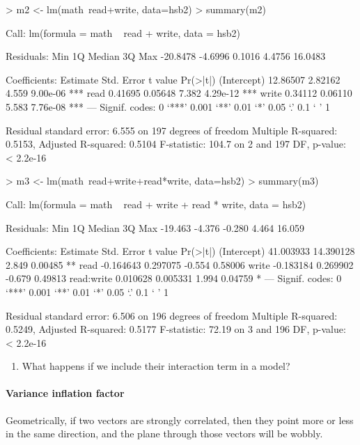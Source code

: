 \documentclass[10pt]{article}
\begin{document}
\begin{Schunk}
\begin{Sinput}
> m2 <- lm(math~read+write, data=hsb2)
> summary(m2)
\end{Sinput}
\begin{Soutput}
Call:
lm(formula = math ~ read + write, data = hsb2)

Residuals:
     Min       1Q   Median       3Q      Max 
-20.8478  -4.6996   0.1016   4.4756  16.0483 

Coefficients:
            Estimate Std. Error t value Pr(>|t|)    
(Intercept) 12.86507    2.82162   4.559 9.00e-06 ***
read         0.41695    0.05648   7.382 4.29e-12 ***
write        0.34112    0.06110   5.583 7.76e-08 ***
---
Signif. codes:  0 ‘***’ 0.001 ‘**’ 0.01 ‘*’ 0.05 ‘.’ 0.1 ‘ ’ 1

Residual standard error: 6.555 on 197 degrees of freedom
Multiple R-squared:  0.5153,	Adjusted R-squared:  0.5104 
F-statistic: 104.7 on 2 and 197 DF,  p-value: < 2.2e-16
\end{Soutput}
\begin{Sinput}
> m3 <- lm(math~read+write+read*write, data=hsb2)
> summary(m3)
\end{Sinput}
\begin{Soutput}
Call:
lm(formula = math ~ read + write + read * write, data = hsb2)

Residuals:
    Min      1Q  Median      3Q     Max 
-19.463  -4.376  -0.280   4.464  16.059 

Coefficients:
             Estimate Std. Error t value Pr(>|t|)   
(Intercept) 41.003933  14.390128   2.849  0.00485 **
read        -0.164643   0.297075  -0.554  0.58006   
write       -0.183184   0.269902  -0.679  0.49813   
read:write   0.010628   0.005331   1.994  0.04759 * 
---
Signif. codes:  0 ‘***’ 0.001 ‘**’ 0.01 ‘*’ 0.05 ‘.’ 0.1 ‘ ’ 1

Residual standard error: 6.506 on 196 degrees of freedom
Multiple R-squared:  0.5249,	Adjusted R-squared:  0.5177 
F-statistic: 72.19 on 3 and 196 DF,  p-value: < 2.2e-16
\end{Soutput}
\end{Schunk}

\begin{enumerate}
  \itemsep0.5in
  \item What happens if we include their interaction term in a model?
\end{enumerate}

\paragraph{Variance inflation factor}
Geometrically, if two vectors are strongly correlated, then they point more or less in the same direction, and the plane through those vectors will be wobbly.
\end{document}
